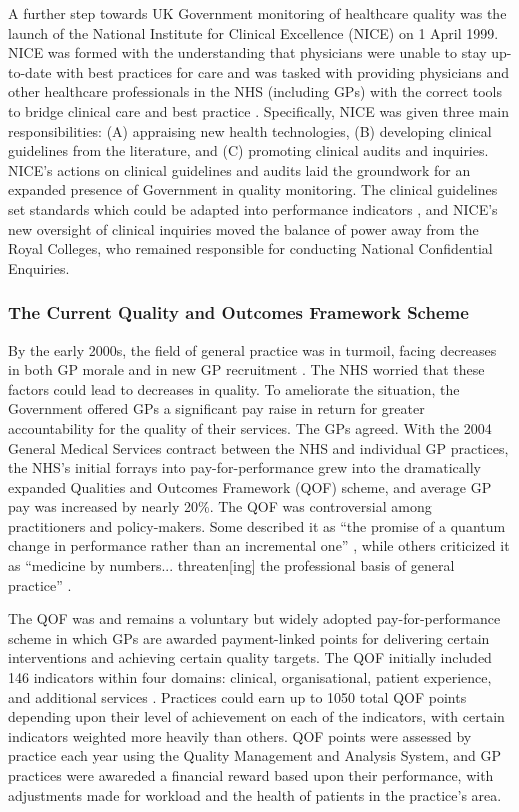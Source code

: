 \documentclass[12pt]{article}
\begin{document}
A further step towards UK Government monitoring of healthcare quality was the launch of the National Institute for Clinical Excellence (NICE) on 1 April 1999. NICE was formed with the understanding that physicians were unable to stay up-to-date with best practices for care and was tasked with providing physicians and other healthcare professionals in the NHS (including GPs) with the correct tools to bridge clinical care and best practice \citep{rawlinsPursuitQualityNational1999}. Specifically, NICE was given three main responsibilities: (A) appraising new health technologies, (B) developing clinical guidelines from the literature, and (C) promoting clinical audits and inquiries. NICE's actions on clinical guidelines and audits laid the groundwork for an expanded presence of Government in quality monitoring. The clinical guidelines set standards which could be adapted into performance indicators \citep{campbellResearchMethodsUsed2002}, and NICE's new oversight of clinical inquiries moved the balance of power away from the Royal Colleges, who remained responsible for conducting National Confidential Enquiries.

\subsubsection{The Current Quality and Outcomes Framework Scheme}

By the early 2000s, the field of general practice was in turmoil, facing decreases in both GP morale and in new GP recruitment \citep{rolandSuccessesFailuresPay2014, rolandQualityOutcomesFramework2016}. The NHS worried that these factors could lead to decreases in quality. To ameliorate the situation, the Government offered GPs a significant pay raise in return for greater accountability for the quality of their services. The GPs agreed. With the 2004 General Medical Services contract between the NHS and individual GP practices, the NHS's initial forrays into pay-for-performance grew into the dramatically expanded Qualities and Outcomes Framework (QOF) scheme, and average GP pay was increased by nearly 20\%. The QOF was controversial among practitioners and policy-makers. Some described it as ``the promise of a quantum change in performance rather than an incremental one'' \citep{shekelleNewContractGeneral2003}, while others criticized it as ``medicine by numbers... threaten[ing] the professional basis of general practice'' \citep{lipmanHowWasIt2005}.

The QOF was and remains a voluntary but widely adopted pay-for-performance scheme in which GPs are awarded payment-linked points for delivering certain interventions and achieving certain quality targets. The QOF initially included 146 indicators within four domains: clinical, organisational, patient experience, and additional services \citep{downingUKGovernmentNew2007}. Practices could earn up to 1050 total QOF points depending upon their level of achievement on each of the indicators, with certain indicators weighted more heavily than others. QOF points were assessed by practice each year using the Quality Management and Analysis System, and GP practices were awareded a financial reward based upon their performance, with adjustments made for workload and the health of patients in the practice's area.
\end{document}
